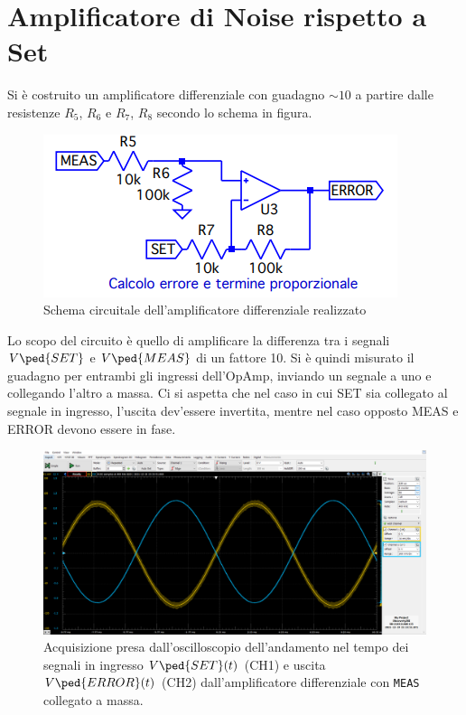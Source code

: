 \documentclass[10pt, a4paper, italian]{article}
\begin{document}
\section{Amplificatore di Noise rispetto a Set}
Si è costruito un amplificatore differenziale con guadagno $\sim 10$ a
partire dalle resistenze $R_5$, $R_6$ e $R_7$, $R_8$ secondo lo schema in
figura.
\begin{figure}[htbp]
    \centering
	\includegraphics[scale=0.8]{errorgen}
    \caption{Schema circuitale dell'amplificatore differenziale realizzato
    \label{schm: errgen}}
\end{figure}
Lo scopo del circuito è quello di amplificare la differenza tra i segnali
$V\ped{SET}$ e $V\ped{MEAS}$ di un fattore 10.
Si è quindi misurato il guadagno per entrambi gli ingressi dell'OpAmp,
inviando un segnale a uno e collegando l'altro a massa. Ci si aspetta che nel
caso in cui SET sia collegato al segnale in ingresso, l'uscita dev'essere
invertita, mentre nel caso opposto MEAS e ERROR devono essere in fase.
\begin{figure}[htbp]
    \centering
	\includegraphics[width=\textwidth]{error.set}
    \caption{Acquisizione presa dall'oscilloscopio dell'andamento nel tempo dei
	segnali in ingresso $V\ped{SET} (t)$ (CH1) e uscita $V\ped{ERROR} (t)$ (CH2)
	dall'amplificatore differenziale con \texttt{MEAS} collegato a massa.
    \label{fig: errset}}
\end{figure}
\end{document}
